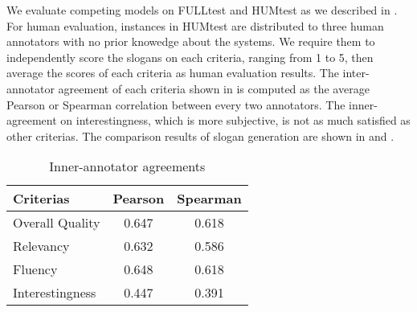 
We evaluate competing models on FULLtest and HUMtest 
as we described in .
For human evaluation, instances in HUMtest are distributed to three human annotators with no prior knowedge about the systems. We require them to independently score the slogans on each criteria, ranging from 1 to 5, then average the scores of each criteria as human evaluation results. The inter-annotator agreement of each criteria shown in  is computed as the average Pearson or Spearman correlation between every two annotators. The inner-agreement on interestingness, which is more subjective, is not as much satisfied as other criterias.
The comparison results of slogan generation are shown in 
 and .

\begin{table}[th]
	\centering
	\caption{Inner-annotator agreements}
	\label{tab:inner_agreement}
	\begin{tabular}{lcc}
		\hline
		Criterias & Pearson & Spearman \\
		\hline
		Overall Quality & 0.647   & 0.618    \\
		Relevancy       & 0.632   & 0.586    \\
		Fluency         & 0.648   & 0.618    \\
		Interestingness & 0.447   & 0.391   \\
		\hline
	\end{tabular}
\end{table}

